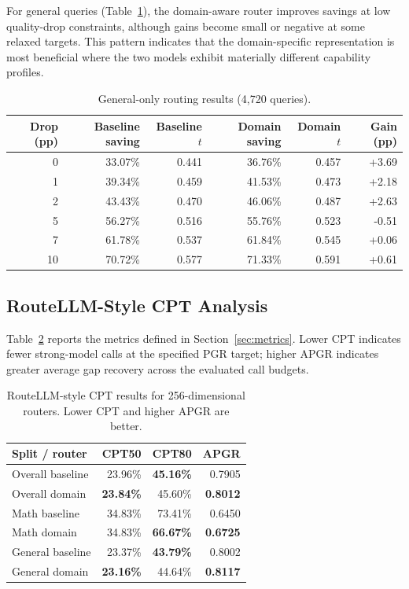 \documentclass[conference]{IEEEtran}
\begin{document}
For general queries (Table~\ref{tab:general}), the domain-aware router improves savings at low quality-drop constraints, although gains become small or negative at some relaxed targets. This pattern indicates that the domain-specific representation is most beneficial where the two models exhibit materially different capability profiles.

\begin{table}[t]
\caption{General-only routing results (4,720 queries).}
\label{tab:general}
\centering
\begin{tabular}{rrrrrr}
\toprule
Drop (pp) & Baseline saving & Baseline $t$ & Domain saving & Domain $t$ & Gain (pp) \\
\midrule
0  & 33.07\% & 0.441 & 36.76\% & 0.457 & +3.69 \\
1  & 39.34\% & 0.459 & 41.53\% & 0.473 & +2.18 \\
2  & 43.43\% & 0.470 & 46.06\% & 0.487 & +2.63 \\
5  & 56.27\% & 0.516 & 55.76\% & 0.523 & -0.51 \\
7  & 61.78\% & 0.537 & 61.84\% & 0.545 & +0.06 \\
10 & 70.72\% & 0.577 & 71.33\% & 0.591 & +0.61 \\
\bottomrule
\end{tabular}
\end{table}

\subsection{RouteLLM-Style CPT Analysis}
Table~\ref{tab:cpt} reports the metrics defined in Section~\ref{sec:metrics}. Lower CPT indicates fewer strong-model calls at the specified PGR target; higher APGR indicates greater average gap recovery across the evaluated call budgets.

\begin{table}[t]
\caption{RouteLLM-style CPT results for 256-dimensional routers. Lower CPT and higher APGR are better.}
\label{tab:cpt}
\centering
\begin{tabular}{lrrr}
\toprule
Split / router & CPT50 & CPT80 & APGR \\
\midrule
Overall baseline & 23.96\% & \textbf{45.16\%} & 0.7905 \\
Overall domain & \textbf{23.84\%} & 45.60\% & \textbf{0.8012} \\
Math baseline & 34.83\% & 73.41\% & 0.6450 \\
Math domain & 34.83\% & \textbf{66.67\%} & \textbf{0.6725} \\
General baseline & 23.37\% & \textbf{43.79\%} & 0.8002 \\
General domain & \textbf{23.16\%} & 44.64\% & \textbf{0.8117} \\
\bottomrule
\end{tabular}
\end{table}
\end{document}
